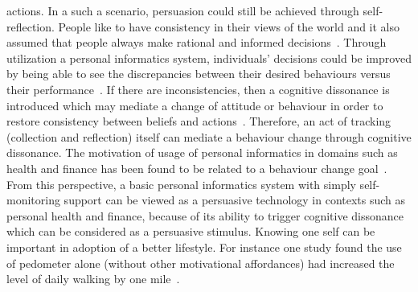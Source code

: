 actions. In a such a scenario, persuasion could still be achieved through self-reflection. People like to have consistency in their views of the world and it also assumed that people always make rational and informed decisions~\citep{Oinas-kukkonen:psd}. Through utilization a personal informatics system, individuals' decisions could be improved by being able to see the discrepancies between their desired behaviours versus their performance~\citep{comber2013designing}. If there are inconsistencies, then a cognitive dissonance is introduced which may mediate a change of attitude or behaviour in order to restore consistency between beliefs and actions~\citep{Oinas-kukkonen:psd}. Therefore, an act of tracking (collection and reflection) itself can mediate a behaviour change through cognitive dissonance. The motivation of usage of personal informatics in domains such as health and finance has been found to be related to a behaviour change goal~\citep{epstein2015lived}. From this perspective, a basic personal informatics system with simply self-monitoring support can be viewed as a persuasive technology in contexts such as personal health and finance, because of its ability to trigger cognitive dissonance which can be considered as a persuasive stimulus. Knowing one self can be important in adoption of a better lifestyle. For instance one study found the use of pedometer alone (without other motivational affordances) had increased the level of daily walking by one mile~\citep{bravata2007using}.  

